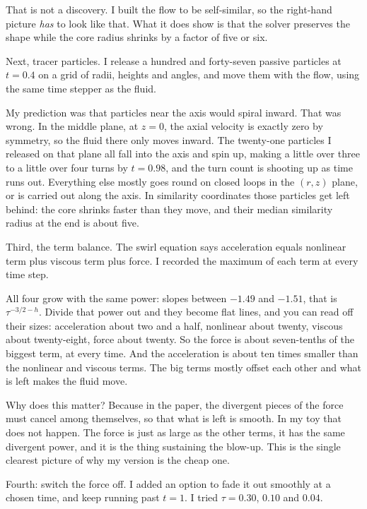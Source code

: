 That is not a discovery. I built the flow to be self-similar, so the right-hand picture \emph{has} to look like that. What it does show is that the solver preserves the shape while the core radius shrinks by a factor of five or six.

Next, tracer particles. I release a hundred and forty-seven passive particles at $t=0.4$ on a grid of radii, heights and angles, and move them with the flow, using the same time stepper as the fluid.

My prediction was that particles near the axis would spiral inward. That was wrong. In the middle plane, at $z=0$, the axial velocity is exactly zero by symmetry, so the fluid there only moves inward. The twenty-one particles I released on that plane all fall into the axis and spin up, making a little over three to a little over four turns by $t=0.98$, and the turn count is shooting up as time runs out. Everything else mostly goes round on closed loops in the $(r,z)$ plane, or is carried out along the axis. In similarity coordinates those particles get left behind: the core shrinks faster than they move, and their median similarity radius at the end is about five.

Third, the term balance. The swirl equation says acceleration equals nonlinear term plus viscous term plus force. I recorded the maximum of each term at every time step.

All four grow with the same power: slopes between $-1.49$ and $-1.51$, that is $\tau^{-3/2-h}$. Divide that power out and they become flat lines, and you can read off their sizes: acceleration about two and a half, nonlinear about twenty, viscous about twenty-eight, force about twenty. So the force is about seven-tenths of the biggest term, at every time. And the acceleration is about ten times smaller than the nonlinear and viscous terms. The big terms mostly offset each other and what is left makes the fluid move.

Why does this matter? Because in the paper, the divergent pieces of the force must cancel among themselves, so that what is left is smooth. In my toy that does not happen. The force is just as large as the other terms, it has the same divergent power, and it is the thing sustaining the blow-up. This is the single clearest picture of why my version is the cheap one.

Fourth: switch the force off. I added an option to fade it out smoothly at a chosen time, and keep running past $t=1$. I tried $\tau=0.30$, $0.10$ and $0.04$.

